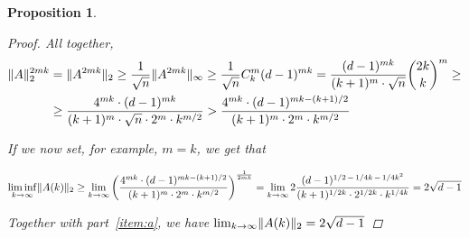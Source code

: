 \documentclass{amsart}
\theoremstyle{plain}
\newtheorem*{proposition}{\textbf{Proposition}}
\theoremstyle{definition}
\DeclarePairedDelimiter{\norm}{\lVert}{\rVert}
\begin{document}
\begin{proposition}
\begin{proof}
            All together,
            \begin{align*}
                    \norm{A}_2^{2mk}
                    & = \norm{A^{2mk}}_2
                    \geq \frac{1}{\sqrt{n}} \norm{A^{2mk}}_\infty
                    \geq \frac{1}{\sqrt{n}} C_{k}^m (d-1)^{mk} =
                    \frac{(d-1)^{mk}}{(k+1)^m \cdot \sqrt{n}} \binom{2k}{k}^{m}  \geq \\
                    & \geq \frac{4^{mk} \cdot (d-1)^{mk}}{(k+1)^m \cdot \sqrt{n} \cdot 2^m \cdot k^{m/2}} >
                    \frac{4^{mk} \cdot (d-1)^{mk - (k+1)/2}}{(k+1)^m \cdot 2^m \cdot k^{m/2}}
            \end{align*}

            If we now set, for example, $m = k$, we get that

            \begin{equation*}
                \liminf_{k \to \infty} \norm{A(k)}_2 \geq
                \lim_{k \to \infty} \left( \frac{4^{mk} \cdot (d-1)^{mk - (k+1)/2}}{(k+1)^m \cdot 2^m \cdot k^{m/2}} \right)^{\frac{1}{2mk}} =
                \lim_{k \to \infty} 2 \frac{(d-1)^{1/2 \, - \, 1/4k\,  - \, 1/4k^2}}{(k+1)^{1/2k} \cdot 2^{1/2k} \cdot k^{1/4k}}
                = 2 \sqrt{d-1}
            \end{equation*}

            Together with part~\ref{item:a}, we have
             $\lim_{k \to \infty} \norm{A(k)}_2 = 2 \sqrt{d-1}$

        \end{proof}
    \end{proposition}
\end{document}
